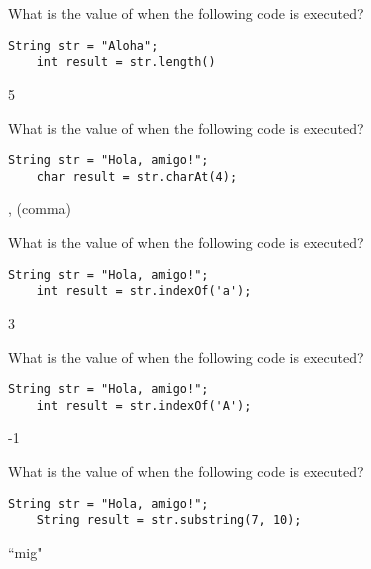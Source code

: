 \begin{questions}
\question What is the value of  when the following code is executed?

\begin{lstlisting}[basicstyle=\large]
	String str = "Aloha";
	int result = str.length()
\end{lstlisting}

\begin{solution}
5
\end{solution}

\question What is the value of  when the following code is executed?

\begin{lstlisting}[basicstyle=\large]
	String str = "Hola, amigo!";
	char result = str.charAt(4);
\end{lstlisting}

\begin{solution}
, (comma)
\end{solution}

\question What is the value of  when the following code is executed?

\begin{lstlisting}[basicstyle=\large]
	String str = "Hola, amigo!";
	int result = str.indexOf('a');
\end{lstlisting}

\begin{solution}
3	
\end{solution}

\question What is the value of  when the following code is executed?

\begin{lstlisting}[basicstyle=\large]
	String str = "Hola, amigo!";
	int result = str.indexOf('A');
\end{lstlisting}

\begin{solution}
-1
\end{solution}

\question What is the value of  when the following code is executed?

\begin{lstlisting}[basicstyle=\large]
	String str = "Hola, amigo!";
	String result = str.substring(7, 10);
\end{lstlisting}

\begin{solution}
``mig"
\end{solution}


\end{questions}
